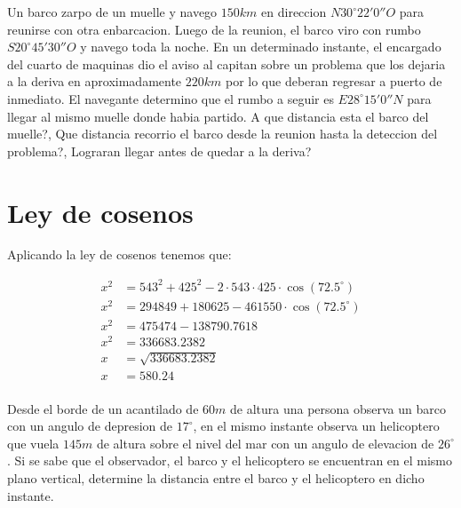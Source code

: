  {
    Un barco zarpo de un muelle y navego $150 km$ en direccion $N 30^\circ22'0''O$
    para reunirse con otra enbarcacion. Luego de la reunion, el barco viro con rumbo
    $S 20^\circ45'30''O$ y navego toda la noche. En un determinado instante, el encargado
    del cuarto de maquinas dio el aviso al capitan sobre un problema que los dejaria a la 
    deriva en aproximadamente $220 km$ por lo que deberan regresar a puerto de inmediato.
    El navegante determino que el rumbo a seguir es $E 28^\circ15'0''N$ para llegar al mismo 
    muelle donde habia partido. A que distancia esta el barco del muelle?, Que distancia 
    recorrio el barco desde la reunion hasta la deteccion del problema?, Lograran llegar 
    antes de quedar a la deriva?
}

 {
}

\section{Ley de cosenos}

 {
    
}

 {
    Aplicando la ley de cosenos tenemos que:

    \[
        \begin{aligned}
            x^2 &= 543^2 + 425^2 - 2\cdot 543\cdot 425\cdot \cos(72.5^\circ) \\
            x^2 &= 294849 + 180625 - 461550 \cdot \cos(72.5^\circ) \\
            x^2 &= 475474 - 138790.7618 \\
            x^2 &= 336683.2382 \\
            x &= \sqrt{336683.2382} \\
            x &= 580.24 \\
        \end{aligned}
    \]
}

 {
    Desde el borde de un acantilado de $60m$ de altura una persona observa un barco
    con un angulo de depresion de $17^\circ$, en el mismo instante observa un 
    helicoptero que vuela $145m$ de altura sobre el nivel del mar con un angulo de 
    elevacion de $26^\circ$. Si se sabe que el observador, el barco y el helicoptero 
    se encuentran en el mismo plano vertical, determine la distancia entre el barco 
    y el helicoptero en dicho instante.
}

